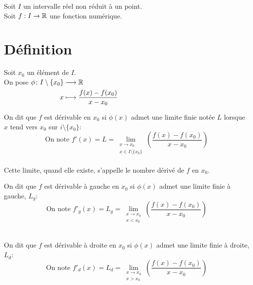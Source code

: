 \documentclass[12pt,twoside,a4paper]{article}
\author{MPSI 2}
\begin{document}
	\maketitle
	\begin{flushleft}
		Soit $I$ un intervalle réel non réduit \`a un point.\\
		Soit $f:I\rightarrow\mathbb{R}$ une fonction numérique.
	\end{flushleft}
	\section{Définition}
	\begin{flushleft}
		Soit $x_0$ un élément de $I$.\\
		On pose $\begin{aligned}[t]\phi\colon I\setminus\{x_0\}&\longrightarrow\mathbb{R} \\x&\longmapsto\frac{f(x)-f(x_0)}{x-x_0}\end{aligned}$
	\end{flushleft}
	\begin{defi}
		\begin{liste}
			\item On dit que $f$ est dérivable en $x_0$ si $\phi(x)$ admet une limite finie notée $L$ lorsque $x$ tend vers $x_0$ sur $i\setminus\{x_0\}$:\\
				$$\text{On note }f'(x)=L=\lim\limits_{\substack{x\rightarrow x_0 \\x\in I\setminus\{x_0\}}}\!\!\left(\frac{f(x)-f(x_0)}{x-x_0} \right) $$\\
				Cette limite, quand elle existe, s'appelle le nombre dérivé de $f$ en $x_0$.
			\item On dit que $f$ est dérivable \`a gauche en $x_0$ si $\phi(x)$ admet une limite finie \`a gauche, $L_g$:\\
				$$\text{On note }f'_g(x)=L_g=\lim\limits_{\substack{x\rightarrow x_0 \\x<x_0}}\!\!\left(\frac{f(x)-f(x_0)}{x-x_0} \right) $$\\
			\item On dit que $f$ est dérivable \`a droite en $x_0$ si $\phi(x)$ admet une limite finie \`a droite, $L_d$:\\
				$$\text{On note }f'_d(x)=L_d=\lim\limits_{\substack{x\rightarrow x_0 \\x>x_0}}\!\!\left(\frac{f(x)-f(x_0)}{x-x_0} \right) $$\\
		\end{liste}
	\end{defi}
\end{document}
